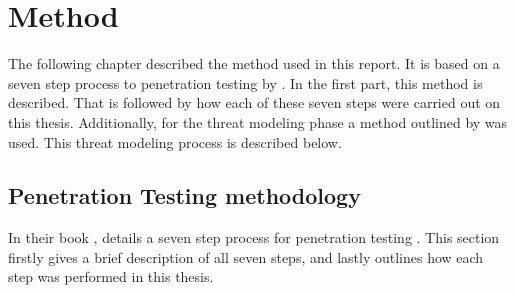 \chapter{Method} \label{ch:method}
The following chapter described the method used in this report. It is based on a seven step process to penetration testing by \textcite{weidman2014}. In the first part, this method is described. That is followed by how each of these seven steps were carried out on this thesis. Additionally, for the threat modeling phase a method outlined by \textcite{guzman2017iot} was used. This threat modeling process is described below.

\section{Penetration Testing methodology} 
In their book , \citeauthor{weidman2014} details a seven step process for penetration testing \cite{weidman2014}. This section firstly gives a brief description of all seven steps, and lastly outlines how each step was performed in this thesis.

